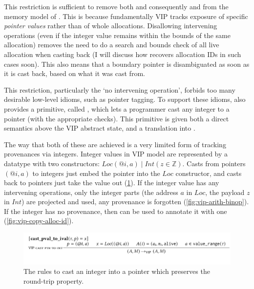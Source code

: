 This restriction is sufficient to remove both  and
consequently  and from the memory model of
. This is because fundamentally VIP tracks exposure of specific
\emph{pointer values} rather than of whole allocations. Disallowing intervening
operations (even if the integer value remains within the bounds of the same
allocation) removes the need to do a search and bounds check of all live
allocation when casting back (I will discuss how  recovers allocation
IDs in such cases soon). This also means that a boundary pointer is
disambiguated as soon as it is cast back, based on what it was cast from.

This restriction, particularly the `no intervening operation', forbids too
many desirable low-level idioms, such as pointer tagging. To
support these idioms,  also provides a primitive, called
, which lets a %
programmer cast any integer to a pointer (with the appropriate checks).
This primitive is given both a direct semantics above the VIP abstract
state, and a translation into .

The way that both of these are achieved is a very limited form of tracking
provenances via integers. Integer values in VIP model are represented by a
datatype with two constructors: $\mathit{Loc(@i, a)} \mid \mathit{Int(z \in
\mathbb{Z})}$. Casts from pointers $(@i, a)$ to integers just embed the pointer
into the $\mathit{Loc}$ constructor, and casts back to pointers just take the
value out (\cref{fig:vip-ival-to-pval}). If the integer value has any
intervening operations, only the integer parts (the address $a$ in
$\mathit{Loc}$, the payload $z$ in $\mathit{Int}$) are projected and used, any
provenance is forgotten (\cref{fig:vip-arith-binop}). If the integer has no
provenance, then  can be used to annotate it with one
(\cref{fig:vip-copy-alloc-id}).

\begin{figure}[tp]
    \includegraphics{figures/mem-model-vip-ival-to-pval}
    \caption{The  rules to cast an integer into a pointer which
    preserves the round-trip property.}\label{fig:vip-ival-to-pval}
\end{figure}


